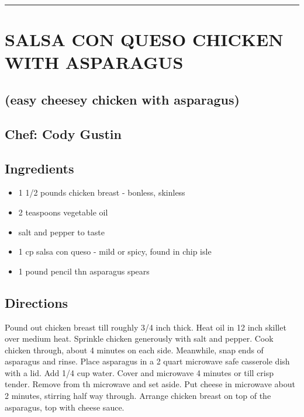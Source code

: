 \documentclass[
]{book}
\providecommand{\tightlist}{%
  \setlength{\itemsep}{0pt}\setlength{\parskip}{0pt}}
\begin{document}
\begin{center}\rule{0.5\linewidth}{0.5pt}\end{center}

\hypertarget{salsa-con-queso-chicken-with-asparagus}{%
\section*{SALSA CON QUESO CHICKEN WITH ASPARAGUS}\label{salsa-con-queso-chicken-with-asparagus}}


\hypertarget{easy-cheesey-chicken-with-asparagus}{%
\subsection*{(easy cheesey chicken with asparagus)}\label{easy-cheesey-chicken-with-asparagus}}


\hypertarget{chef-cody-gustin}{%
\subsection*{Chef: Cody Gustin}\label{chef-cody-gustin}}


\hypertarget{ingredients-64}{%
\subsection*{Ingredients}\label{ingredients-64}}


\begin{itemize}
\tightlist
\item
  1 1/2 pounds chicken breast - bonless, skinless
\item
  2 teaspoons vegetable oil
\item
  salt and pepper to taste
\item
  1 cp salsa con queso - mild or spicy, found in chip isle
\item
  1 pound pencil thn asparagus spears
\end{itemize}

\hypertarget{directions-64}{%
\subsection*{Directions}\label{directions-64}}


Pound out chicken breast till roughly 3/4 inch thick. Heat oil in 12 inch skillet over medium heat. Sprinkle chicken
generously with salt and pepper. Cook chicken through, about 4 minutes on each side. Meanwhile, snap ends of
asparagus and rinse. Place asparagus in a 2 quart microwave safe casserole dish with a lid. Add 1/4 cup water.
Cover and microwave 4 minutes or till crisp tender. Remove from th microwave and set aside. Put cheese in microwave
about 2 minutes, stirring half way through. Arrange chicken breast on top of the asparagus, top with cheese sauce.
\end{document}
